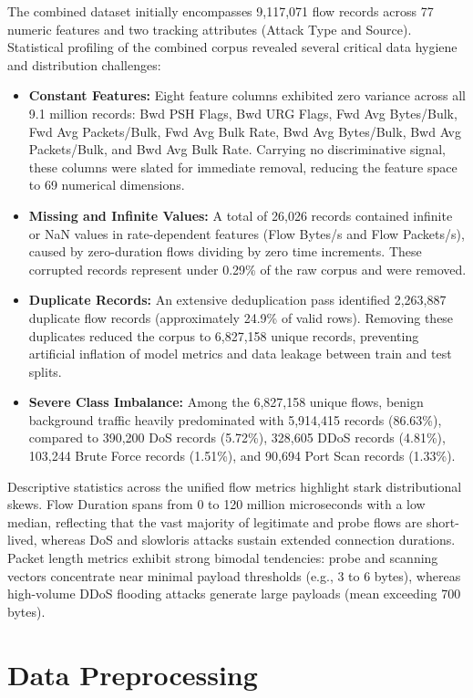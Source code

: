 \documentclass[12pt,a4paper]{report}
\begin{document}
The combined dataset initially encompasses 9,117,071 flow records across 77 numeric features and two tracking attributes (Attack Type and Source). Statistical profiling of the combined corpus revealed several critical data hygiene and distribution challenges:
\begin{itemize}
    \item \textbf{Constant Features:} Eight feature columns exhibited zero variance across all 9.1 million records: Bwd PSH Flags, Bwd URG Flags, Fwd Avg Bytes/Bulk, Fwd Avg Packets/Bulk, Fwd Avg Bulk Rate, Bwd Avg Bytes/Bulk, Bwd Avg Packets/Bulk, and Bwd Avg Bulk Rate. Carrying no discriminative signal, these columns were slated for immediate removal, reducing the feature space to 69 numerical dimensions.
    \item \textbf{Missing and Infinite Values:} A total of 26,026 records contained infinite or NaN values in rate-dependent features (Flow Bytes/s and Flow Packets/s), caused by zero-duration flows dividing by zero time increments. These corrupted records represent under 0.29\% of the raw corpus and were removed.
    \item \textbf{Duplicate Records:} An extensive deduplication pass identified 2,263,887 duplicate flow records (approximately 24.9\% of valid rows). Removing these duplicates reduced the corpus to 6,827,158 unique records, preventing artificial inflation of model metrics and data leakage between train and test splits.
    \item \textbf{Severe Class Imbalance:} Among the 6,827,158 unique flows, benign background traffic heavily predominated with 5,914,415 records (86.63\%), compared to 390,200 DoS records (5.72\%), 328,605 DDoS records (4.81\%), 103,244 Brute Force records (1.51\%), and 90,694 Port Scan records (1.33\%).
\end{itemize}

Descriptive statistics across the unified flow metrics highlight stark distributional skews. Flow Duration spans from 0 to 120 million microseconds with a low median, reflecting that the vast majority of legitimate and probe flows are short-lived, whereas DoS and slowloris attacks sustain extended connection durations. Packet length metrics exhibit strong bimodal tendencies: probe and scanning vectors concentrate near minimal payload thresholds (e.g., 3 to 6 bytes), whereas high-volume DDoS flooding attacks generate large payloads (mean exceeding 700 bytes).
\newpage
\section{Data Preprocessing}
\end{document}

